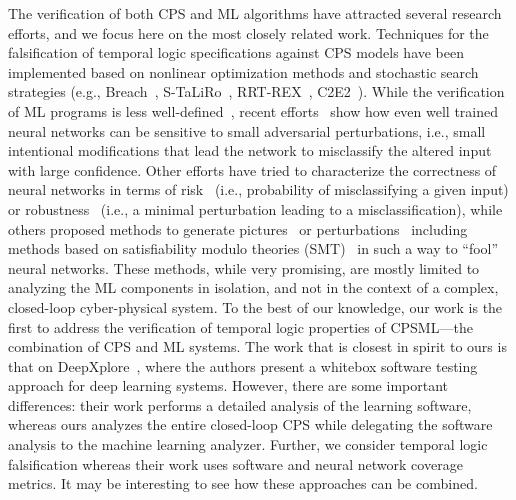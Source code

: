 The verification of both CPS and ML algorithms have attracted several research efforts,
and we focus here on the most closely related work.
Techniques for the falsification of temporal logic specifications against CPS models
have been implemented based on nonlinear optimization methods and stochastic search strategies
(e.g., Breach~\cite{donze2010breach}, S-TaLiRo~\cite{annpureddyLFS11}, 
RRT-REX~\cite{dreossi2015efficient}, C2E2~\cite{duggirala2015c2e2}).
While the verification of ML programs is less well-defined~\cite{SeshiaS16},
recent efforts~\cite{szegedy2013intriguing} show how
even well trained neural networks can be sensitive to small adversarial perturbations, i.e., small intentional modifications that
lead the network to misclassify the altered input with large confidence.
Other efforts have tried to characterize the correctness of neural networks 
in terms of risk~\cite{vapnik1991principles}
(i.e., probability of misclassifying a given input) or 
robustness~\cite{fawzi2015analysis,carlini-ieeesp17} 
(i.e., a minimal perturbation leading to a misclassification),
while others proposed methods to generate pictures~\cite{nguyen2015deep,dreossi-rmlw17} 
or perturbations~\cite{moosavi2015deepfool,nguyen2015deep,huang-arxiv16}
including methods based on satisfiability modulo theories (SMT)~\cite{katz-cav17}
in such a way to ``fool'' neural networks. 
These methods, while very promising, are mostly limited
to analyzing the ML components in isolation, and not in the context of a complex, closed-loop
cyber-physical system. 
To the best of our knowledge, 
our work is the first to address the verification of temporal logic
properties of CPSML---the combination
of CPS and ML systems.
The work that is closest in spirit to ours is that on DeepXplore~\cite{pei-sosp17},
where the authors present a whitebox software testing approach
for deep learning systems. However, there are some important
differences: their work performs a detailed analysis of the learning software, whereas
ours analyzes the entire closed-loop CPS while delegating the software
analysis to the machine learning analyzer. Further, we consider temporal
logic falsification whereas their work uses software and neural
network coverage metrics. It may be interesting to see how these
approaches can be combined.



